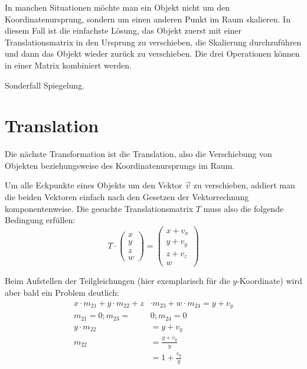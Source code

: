 In manchen Situationen möchte man ein Objekt nicht um den Koordinatenursprung, sondern um einen anderen Punkt im Raum skalieren. In diesem Fall ist die einfachste Lösung, das Objekt zuerst mit einer Translationsmatrix in den Ursprung zu verschieben, die Skalierung durchzuführen und dann das Objekt wieder zurück zu verschieben. Die drei Operationen können in einer Matrix kombiniert werden.


Sonderfall Spiegelung.

\section{Translation}
\label{translation}
Die nächste Transformation ist die Translation, also die Verschiebung von Objekten beziehungsweise des Koordinatenursprungs im Raum.

Um alle Eckpunkte eines Objekts um den Vektor $\vec v$ zu verschieben, addiert man die beiden Vektoren einfach nach den Gesetzen der Vektorrechnung komponentenweise. Die gesuchte Translationsmatrix $T$ muss also die folgende Bedingung erfüllen:
\begin{equation}
 T \cdot 
 \begin{pmatrix}
  x \\
  y \\
  z \\
  w
 \end{pmatrix}
 =
 \begin{pmatrix}
  x + v_x \\
  y + v_y \\
  z + v_z \\
  w
 \end{pmatrix}
\end{equation}

Beim Aufstellen der Teilgleichungen (hier exemplarisch für die $y$-Koordinate) wird aber bald ein Problem deutlich:
\begin{equation}
\begin{split}
 x \cdot m_{21} + y \cdot m_{22} + z & \cdot m_{23} + w \cdot m_{24} = y + v_y \\
 m_{21} = 0; m_{23} = & 0; m_{24} = 0 \\
 y \cdot m_{22} & = y + v_y \\
 m_{22} & = \frac{y + v_y}{y} \\
 & = 1 + \frac{v_y}{y}
\end{split}
\end{equation}

